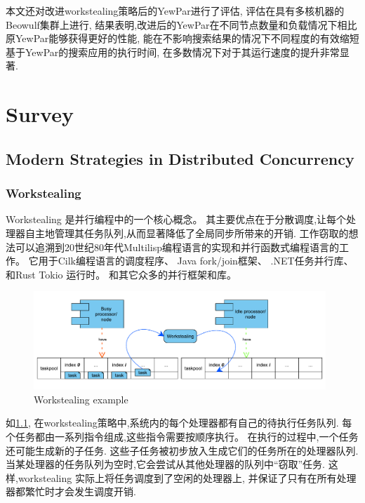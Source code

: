 \documentclass{mproj}
\begin{document}
本文还对改进workstealing策略后的YewPar进行了评估,
评估在具有多核机器的Beowulf集群上进行,
结果表明,改进后的YewPar在不同节点数量和负载情况下相比原YewPar能够获得更好的性能,
能在不影响搜索结果的情况下不同程度的有效缩短基于YewPar的搜索应用的执行时间,
在多数情况下对于其运行速度的提升非常显著.


\chapter{Survey}\label{survey}


\section{Modern Strategies in Distributed Concurrency}
\subsection{Workstealing}
Workstealing 是并行编程中的一个核心概念。
其主要优点在于分散调度,让每个处理器自主地管理其任务队列,从而显著降低了全局同步所带来的开销.
工作窃取的想法可以追溯到20世纪80年代Multilisp编程语言的实现和并行函数式编程语言的工作\cite{10.1145/324133.324234}。
它用于Cilk编程语言的调度程序\cite{BLUMOFE199655}、
Java fork/join框架\cite{lea2000forkjoin}、
.NET任务并行库\cite{leijen2009design}、
和Rust Tokio 运行时\cite{tokio,krill2021tokio}。
和其它众多的并行框架和库。

\begin{figure}[h]
    \centering %
    \includegraphics[width=0.98\textwidth]{images/workstealing.pdf} %
    \caption{Workstealing example} %
    \label{fig:workstealing} %
\end{figure}
\FloatBarrier

如\cref{fig:workstealing},
在workstealing策略中,系统内的每个处理器都有自己的待执行任务队列.
每个任务都由一系列指令组成,这些指令需要按顺序执行。
在执行的过程中,一个任务还可能生成新的子任务.
这些子任务被初步放入生成它们的任务所在的处理器队列.
当某处理器的任务队列为空时,它会尝试从其他处理器的队列中“窃取”任务.
这样,workstealing 实际上将任务调度到了空闲的处理器上,
并保证了只有在所有处理器都繁忙时才会发生调度开销.\cite{10.1145/1248377.1248396}
\end{document}
